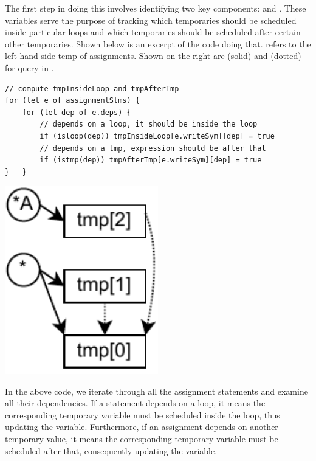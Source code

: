 \documentclass[runningheads]{llncs}
\begin{document}
The first step in doing this involves identifying two key
components:  and .
These variables serve the purpose of tracking which temporaries should be scheduled
inside particular loops and which temporaries should be scheduled after
certain other temporaries.
Shown below is an excerpt of the code doing that.
 refers to the left-hand side temp of assignments.
Shown on the right are  (solid) and  (dotted)
for query in .

\begin{minipage}{0.7\textwidth}
\begin{lstlisting}[style=JavaScript, columns=flexible]
// compute tmpInsideLoop and tmpAfterTmp
for (let e of assignmentStms) {
    for (let dep of e.deps) {
        // depends on a loop, it should be inside the loop
        if (isloop(dep)) tmpInsideLoop[e.writeSym][dep] = true
        // depends on a tmp, expression should be after that
        if (istmp(dep)) tmpAfterTmp[e.writeSym][dep] = true
}   }
\end{lstlisting}
\end{minipage}
\begin{minipage}{0.3\textwidth}
\includegraphics[width=0.5\textwidth]{images/q3_deps.pdf}
\end{minipage}

In the above code, we iterate through all the assignment statements and examine all
their dependencies.
If a statement depends on a loop, it means the corresponding temporary variable must
be scheduled inside the loop, thus updating the  variable.
Furthermore, if an assignment depends on another temporary value, it means the
corresponding temporary variable must be scheduled after that, consequently updating
the  variable.
\end{document}
